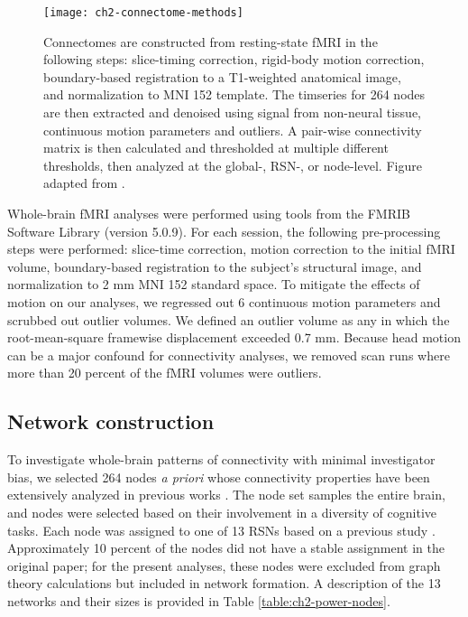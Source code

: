 \begin{figure}[t]
    \centering
    \texttt{[image: ch2-connectome-methods]}
    \caption[Schematic for connectome construction.]{Connectomes are constructed from resting-state fMRI in the following steps: slice-timing correction, rigid-body motion correction, boundary-based registration to a T1-weighted anatomical image, and normalization to MNI 152 template. The timseries for 264 nodes are then extracted and denoised using signal from non-neural tissue, continuous motion parameters and outliers. A pair-wise connectivity matrix is then calculated and thresholded at multiple different thresholds, then analyzed at the global-, RSN-, or node-level. Figure adapted from \citep{Yang2018}.}
    \label{fig:ch2-connectome-methods}
\end{figure}

Whole-brain fMRI analyses were performed using tools from the FMRIB Software Library (version 5.0.9). For each session, the following pre-processing steps were performed:  slice-time correction, motion correction to the initial fMRI volume, boundary-based registration to the subject's structural image, and normalization to 2 mm MNI 152 standard space. To mitigate the effects of motion on our analyses, we regressed out 6 continuous motion parameters and scrubbed out outlier volumes. We defined an outlier volume as any in which the root-mean-square framewise displacement exceeded 0.7 mm. Because head motion can be a major confound for connectivity analyses, we removed scan runs where more than 20 percent of the fMRI volumes were outliers.

\subsection{Network construction}

To investigate whole-brain patterns of connectivity with minimal investigator bias, we selected 264 nodes \textit{a priori} whose connectivity properties have been extensively analyzed in previous works \citep{Power2011, Power2013, Cole2014}. The node set samples the entire brain, and nodes were selected based on their involvement in a diversity of cognitive tasks. Each node was assigned to one of 13 RSNs based on a previous study \citep{Power2013}. Approximately 10 percent of the nodes did not have a stable assignment in the original paper; for the present analyses, these nodes were excluded from graph theory calculations but included in network formation. A description of the 13 networks and their sizes is provided in Table \ref{table:ch2-power-nodes}. 

